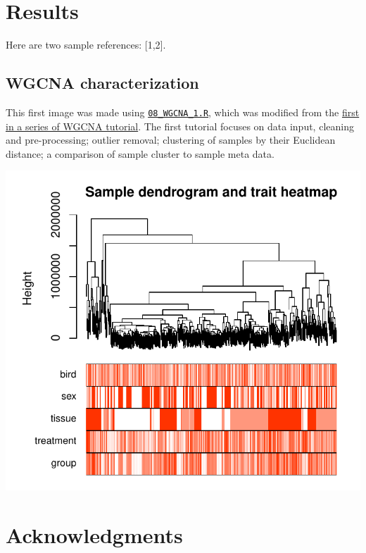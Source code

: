 \documentclass[10pt,letterpaper]{article}
\begin{document}
\hypertarget{results}{%
\section{Results}\label{results}}

Here are two sample references: {[}1,2{]}.

\hypertarget{wgcna-characterization}{%
\subsection{WGCNA characterization}\label{wgcna-characterization}}

This first image was made using
\href{https://github.com/macmanes-lab/DoveParentsRNAseq/blob/master/analysis/08_WGCNA_1.R}{\texttt{08\_WGCNA\_1.R}},
which was modified from the
\href{https://horvath.genetics.ucla.edu/html/CoexpressionNetwork/Rpackages/WGCNA/Tutorials/Consensus-DataInput.R}{first
in a series of WGCNA tutorial}. The first tutorial focuses on data
input, cleaning and pre-processing; outlier removal; clustering of
samples by their Euclidean distance; a comparison of sample cluster to
sample meta data.

\includegraphics{manuscript_draft_files/figure-latex/wgcna-1.pdf}

\hypertarget{acknowledgments}{%
\section{Acknowledgments}\label{acknowledgments}}
\end{document}
